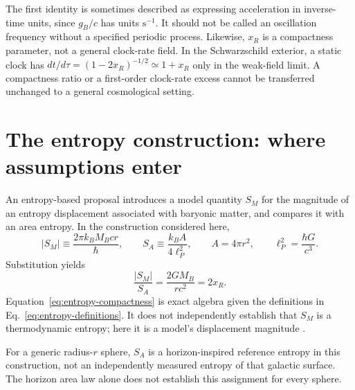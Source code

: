 \documentclass[12pt]{article}
\begin{document}
The first identity is sometimes described as expressing acceleration in inverse-time units, since $g_B/c$ has units $\mathrm{s^{-1}}$. It should not be called an oscillation frequency without a specified periodic process. Likewise, $x_R$ is a compactness parameter, not a general clock-rate field. In the Schwarzschild exterior, a static clock has $dt/d\tau=(1-2x_R)^{-1/2}\simeq1+x_R$ only in the weak-field limit. A compactness ratio or a first-order clock-rate excess cannot be transferred unchanged to a general cosmological setting.

\section{The entropy construction: where assumptions enter}
\label{sec:entropy-model}

An entropy-based proposal introduces a model quantity $S_M$ for the magnitude of an entropy displacement associated with baryonic matter, and compares it with an area entropy. In the construction considered here,
\begin{equation}
  |S_M|\equiv\frac{2\pi k_B M_B c r}{\hbar},
  \qquad
  S_A\equiv\frac{k_B A}{4\ell_P^2},
  \qquad
  A=4\pi r^2,
  \qquad
  \ell_P^2=\frac{\hbar G}{c^3}.
  \label{eq:entropy-definitions}
\end{equation}
Substitution yields
\begin{equation}
  \frac{|S_M|}{S_A}
  =\frac{2GM_B}{rc^2}=2x_R.
  \label{eq:entropy-compactness}
\end{equation}
Equation~\eqref{eq:entropy-compactness} is exact algebra given the definitions in Eq.~\eqref{eq:entropy-definitions}. It does not independently establish that $S_M$ is a thermodynamic entropy; here it is a model's displacement magnitude \cite{Verlinde}.

For a generic radius-$r$ sphere, $S_A$ is a horizon-inspired reference entropy in this construction, not an independently measured entropy of that galactic surface. The horizon area law alone does not establish this assignment for every sphere.
\end{document}
